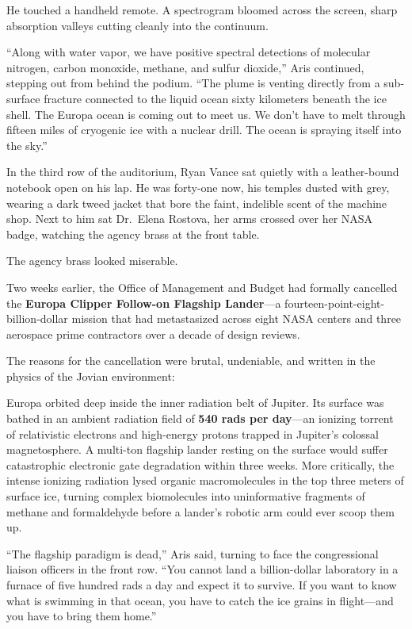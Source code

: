 \documentclass[12pt,twoside,openright]{book}
\begin{document}
He touched a handheld remote. A spectrogram bloomed across the screen,
sharp absorption valleys cutting cleanly into the continuum.

``Along with water vapor, we have positive spectral detections of
molecular nitrogen, carbon monoxide, methane, and sulfur dioxide,'' Aris
continued, stepping out from behind the podium. ``The plume is venting
directly from a sub-surface fracture connected to the liquid ocean sixty
kilometers beneath the ice shell. The Europa ocean is coming out to meet
us. We don't have to melt through fifteen miles of cryogenic ice with a
nuclear drill. The ocean is spraying itself into the sky.''

In the third row of the auditorium, Ryan Vance sat quietly with a
leather-bound notebook open on his lap. He was forty-one now, his
temples dusted with grey, wearing a dark tweed jacket that bore the
faint, indelible scent of the machine shop. Next to him sat Dr.~Elena
Rostova, her arms crossed over her NASA badge, watching the agency brass
at the front table.

The agency brass looked miserable.

Two weeks earlier, the Office of Management and Budget had formally
cancelled the \textbf{Europa Clipper Follow-on Flagship Lander}---a
fourteen-point-eight-billion-dollar mission that had metastasized across
eight NASA centers and three aerospace prime contractors over a decade
of design reviews.

The reasons for the cancellation were brutal, undeniable, and written in
the physics of the Jovian environment:

Europa orbited deep inside the inner radiation belt of Jupiter. Its
surface was bathed in an ambient radiation field of \textbf{540 rads per
day}---an ionizing torrent of relativistic electrons and high-energy
protons trapped in Jupiter's colossal magnetosphere. A multi-ton
flagship lander resting on the surface would suffer catastrophic
electronic gate degradation within three weeks. More critically, the
intense ionizing radiation lysed organic macromolecules in the top three
meters of surface ice, turning complex biomolecules into uninformative
fragments of methane and formaldehyde before a lander's robotic arm
could ever scoop them up.

``The flagship paradigm is dead,'' Aris said, turning to face the
congressional liaison officers in the front row. ``You cannot land a
billion-dollar laboratory in a furnace of five hundred rads a day and
expect it to survive. If you want to know what is swimming in that
ocean, you have to catch the ice grains in flight---and you have to
bring them home.''
\end{document}
